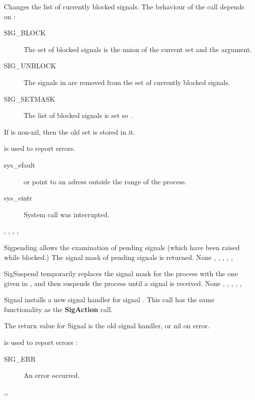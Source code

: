 {
Changes the list of currently blocked signals. The behaviour of the call
depends on  :
\begin{description}
\item[SIG\_BLOCK] The set of blocked signals is the union of the current set
and the  argument.
\item[SIG\_UNBLOCK] The signals in  are removed from the set of
currently blocked signals.
\item[SIG\_SETMASK] The list of blocked signals is set so .
\end{description}
If  is non-nil, then the old set is stored in it.
}
{ is used to report errors.
\begin{description}
\item[sys\_efault]  or  point to an adress outside
the range of the process.
\item[sys\_eintr] System call was interrupted.
\end{description}
}
{, , , ,
 }

{
Sigpending allows the examination of pending signals (which have been raised
while blocked.) The signal mask of pending signals is returned.
}
{None}
{, , , ,
,  }

{SigSuspend temporarily replaces the signal mask for the process with the one
given in , and then suspends the process until a signal is received.
}
{None}
{, , , ,
,  }

{
Signal installs a new signal handler for signal . This call has
the same functionality as the \textbf{SigAction} call.

The return value for Signal is the old signal handler, or nil on error.
}
{ is used to report errors :
\begin{description}
\item[SIG\_ERR] An error occurred.
\end{description}
}
{,,  }

